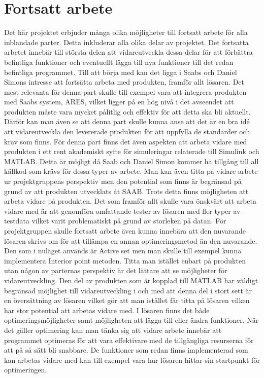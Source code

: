 \section{Fortsatt arbete}
Det här projektet erbjuder många olika möjligheter till fortsatt arbete för alla inblandade parter. Detta inkluderar alla olika delar av projektet. Det fortsatta arbetet innebär till största delen att vidareutveckla dessa delar för att förbättra befintliga funktioner och eventuellt lägga till nya funktioner till det redan befintliga programmet. 
\newline \newline
Till att börja med kan det ligga i Saabs och Daniel Simons intresse att fortsätta arbeta med produkten, framför allt lösaren. Det mest relevanta för denna part skulle till exempel vara att integrera produkten med Saabs system, ARES, vilket ligger på en hög nivå i det avseendet att produkten måste vara mycket pålitlig och effektiv för att detta ska bli aktuellt. Därför kan man även se att denna part skulle kunna anse att det är en bra idé att vidareutveckla den levererade produkten för att uppfylla de standarder och krav som finns. För denna part finns det även aspekten att arbeta vidare med produkten i ett rent akademiskt syfte för simuleringar relaterade till Simulink och MATLAB. Detta är möjligt då Saab och Daniel Simon kommer ha tillgång till all källkod som krävs för dessa typer av arbete.
\newline \newline
Man kan även titta på vidare arbete ur projektgruppens perspektiv men den potential som finns är begränsad på grund av att produkten utvecklats åt SAAB. Trots detta finns möjligheten att arbeta vidare på produkten. Det som framför allt skulle vara önskvärt att arbeta vidare med är att genomföra omfattande tester av lösaren med fler typer av testdata vilket varit problematiskt på grund av storleken på datan. För projektgruppen skulle fortsatt arbete även kunna innebära att den nuvarande lösaren skrivs om för att tillämpa en annan optimeringsmetod än den nuvarande. Den som i nuläget används är Active set men man skulle till exempel kunna implementera Interior point metoden.
\newline \newline
Titta man istället enbart på produkten utan någon av parternas perspektiv är det lättare att se möjligheter för vidareutveckling. Den del av produkten som är kopplad till MATLAB har väldigt begränsad möjlighet till vidareutveckling i och med att denna del i stort sett är en översättning av lösaren vilket gör att man istället får titta på lösaren vilken har stor potential att arbetas vidare med. I lösaren finns det både optimeringsmöjligheter samt möjligheten att lägga till eller ändra funktioner. När det gäller optimering kan man tänka sig att vidare arbete innebär att programmet optimeras för att vara effektivare med de tillgängliga resurserna för att på så sätt bli snabbare. De funktioner som redan finns implementerad som kan arbetas vidare med kan till exempel vara hur lösaren hittar sin startpunkt för optimeringen.
